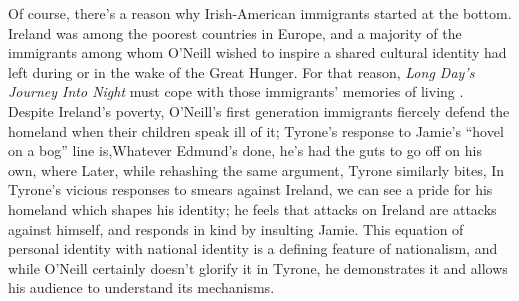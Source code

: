 \documentclass[letterpaper, 12pt]{article}
\newcommand{\ldjin}{\textit{Long Day's Journey Into Night}}
\newcommand{\oneill}{O'Neill}
\begin{document}
Of course, there's a reason why Irish-American immigrants started at the
bottom. Ireland was among the poorest countries in Europe, and a majority of
the immigrants among whom \oneill{} wished to inspire a shared cultural
identity had left during or in the wake of the Great Hunger. For that reason,
\ldjin{} must cope with those immigrants' memories of living
. Despite Ireland's
poverty, \oneill{}'s first generation immigrants fiercely defend the homeland
when their children speak ill of it; Tyrone's response to Jamie's
\enquote{hovel on a bog} line is,Whatever Edmund's done, he's had the guts to go off on his own, where
 Later, while
rehashing the same argument, Tyrone similarly bites,
 In Tyrone's vicious
responses to smears against Ireland, we can see a pride for his homeland which
shapes his identity; he feels that attacks on Ireland are attacks against
himself, and responds in kind by insulting Jamie. This equation of personal
identity with national identity is a defining feature of nationalism, and
while \oneill{} certainly doesn't glorify it in Tyrone, he demonstrates it and
allows his audience to understand its mechanisms.
\end{document}
